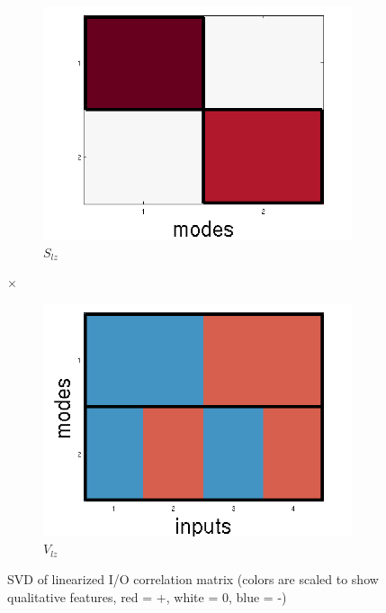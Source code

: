 \documentclass[10pt,letterpaper]{article}
\begin{document}
\begin{figure}
\begin{subfigure}{0.22\textwidth}
\includegraphics[width=\textwidth]{figures/S_lz.png}
\caption{$S_{lz}$}
\end{subfigure}
\LARGE{$\times$}
\begin{subfigure}{0.22\textwidth}
\includegraphics[width=\textwidth]{figures/V_lz.png}
\caption{$V_{lz}$}
\end{subfigure}
\caption{SVD of linearized I/O correlation matrix (colors are scaled to show qualitative features, red = +, white = 0, blue = -)}
\label{linearized_SVD_figure}
\end{figure}
\end{document}
